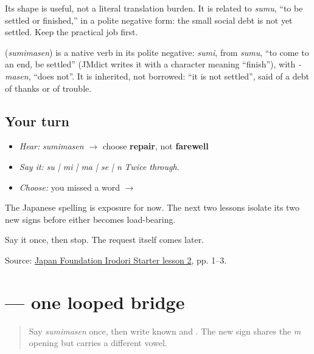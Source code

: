 Its shape is useful, not a literal translation burden. It is related to \emph{sumu}, “to be settled or finished,” in a polite negative form: the small social debt is not yet settled. Keep the practical job first.

\begin{cousinweb}
\textbf{} (\emph{sumimasen}) is a native verb in its polite negative: \emph{sumi}, from \emph{sumu}, \textquotedblleft{}to come to an end, be settled\textquotedblright{} (JMdict writes it with a character meaning \textquotedblleft{}finish\textquotedblright{}), with \emph{-masen}, \textquotedblleft{}does not\textquotedblright{}. It is inherited, not borrowed: \textquotedblleft{}it is not settled\textquotedblright{}, said of a debt of thanks or of trouble.
\end{cousinweb}

\subsection*{Your turn}
\begin{itemize}
\raggedright
  \item \emph{Hear:} \emph{sumimasen} $\to$ choose \textbf{repair}, not \textbf{farewell}
  \item \emph{Say it:} \emph{su | mi | ma | se | n} \emph{Twice through.}
  \item \emph{Choose:} you missed a word $\to$ \textbf{}
\end{itemize}

The Japanese spelling is exposure for now. The next two lessons isolate its two new signs before either becomes load-bearing.

\begin{tcolorbox}[breakable,colback=teal!4,colframe=teal!35!black,title={Before you move on}]
Say it once, then stop. The request itself comes later.

Source: \href{https://www.irodori.jpf.go.jp/assets/data/starter/pdf/X\_L02.pdf}{Japan Foundation Irodori Starter lesson 2}, pp. 1–3.
\end{tcolorbox}
\section[\texorpdfstring{\ja{み} (mi)}{み (mi)}]{ — one looped bridge}

\label{lesson:JA-W09-mi}



\begin{quote}
Say \emph{sumimasen} once, then write known \textbf{} and \textbf{}. The new sign shares the \emph{m} opening but carries a different vowel.
\end{quote}


